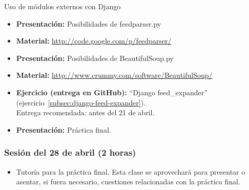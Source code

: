 \documentclass[a4paper,12pt]{article}
\begin{document}
Uso de módulos externos con Django

\begin{itemize}
  \item \textbf{Presentación:} Posibilidades de feedparser.py
  \item \textbf{Material:} \url{http://code.google.com/p/feedparser/}
  \item \textbf{Presentación:} Posibilidades de BeautifulSoup.py
  \item \textbf{Material:} \url{http://www.crummy.com/software/BeautifulSoup/}
  \item \textbf{Ejercicio (entrega en GitHub):} ``Django feed\_expander'' (ejercicio~\ref{subsec:django-feed-expander}). \\
  Entrega recomendada: antes del 21 de abril.
\item \textbf{Presentación:} Práctica final.
\end{itemize}


\subsubsection{Sesión del 28 de abril (2 horas)}

\begin{itemize}
  \item Tutoría para la práctica final. Esta clase se aprovechará para presentar o asentar, si fuera necesario, cuestiones relacionadas con la práctica final.
\end{itemize}

%
%

%
%
%
\end{document}
